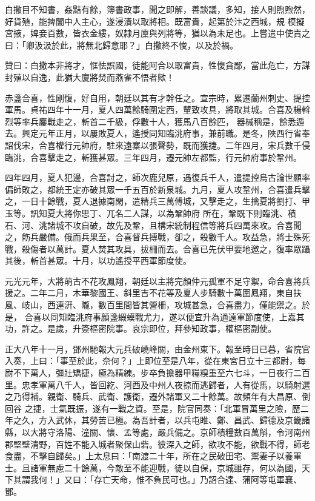 \begin{pinyinscope}
 白撒目不知書，姦黠有餘，簿書政事，聞之即解，善談議，多知，接人則煦煦然，好貨殖，能捭闔中人主心，遂浸漬以取將相。既富貴，起第於汴之西城，規
 模擬宮掖，婢妾百數，皆衣金縷，奴隸月廩與列將等，猶以為未足也。上嘗遣中使責之曰：「卿汲汲於此，將無北歸意耶？」白撒終不悛，以及於禍。



 贊曰：白撒本非將才，恇怯誤國，徒能阿合以取富貴，性愎貪鄙，當此危亡，方謀封殖以自逸，此猶大廈將焚而燕雀不悟者歟！



 赤盞合喜，性剛愎，好自用，朝廷以其有才幹任之。宣宗時，累遷蘭州刺史、提控軍馬。貞祐四年十一月，夏人四萬餘騎圍定西，輦致攻具，將取其城。合喜及楊斡烈等率兵鏖戰走之，斬首二千級，俘數十人，獲馬八百餘匹，
 器械稱是，餘悉遁去。興定元年正月，以屢敗夏人，遙授同知臨洮府事，兼前職。是冬，陜西行省奉詔伐宋，合喜權行元帥府，駐來遠寨以張聲勢，既而獲捷。二年四月，宋兵數千侵臨洮，合喜擊走之，斬獲甚眾。三年四月，遷元帥左都監，行元帥府事於鞏州。



 四年四月，夏人犯邊，合喜討之，師次鹿兒原，遇復兵千人，遣提控烏古論世顯率偏師敗之，都統王定亦破其眾一千五百於新泉城。九月，夏人攻鞏州，合喜遣兵擊之，一日十餘戰，夏人退據南閑，遣精兵三萬傅城，又擊走之，生擒夏將劉打、甲玉等。訊知夏大將你思丁、兀名二人謀，以為鞏帥府
 所在，鞏既下則臨洮、積石、河、洮諸城不攻自破，故先及鞏，且構宋統制程信等將兵四萬來攻。合喜聞之，飭兵嚴備。俄而兵果至，合喜督兵搏戰，卻之，殺數千人。攻益急，將士殊死戰，殺傷者以萬計。夏人焚其攻具，拔柵而去。合喜已先伏甲要地邀之，復率眾躡其後，斬首甚眾。十月，以功遙授平西軍節度使。



 元光元年，大將萌古不花攻鳳翔，朝廷以主將完顏仲元孤軍不足守禦，命合喜將兵援之。二年二月，木華黎國王、斜里吉不花等及夏人步騎數十萬圍鳳翔，東自扶風、岐山，西連汧、隴，數百里間皆其營柵，攻城甚急，合喜盡力，僅能禦之。於是，
 合喜以同知臨洮府事顏盞蝦蟆戰尤力，遂以便宜升為通遠軍節度使，上嘉其功，許之。是歲，升簽樞密院事。哀宗即位，拜參知政事，權樞密副使。



 正大八年十一月，鄧州馳報大元兵破嶢峰關，由金州東下。報至時日已暮，省院官入奏，上曰：「事至於此，奈何？」上即位至是八年，從在東宮日立十三都尉，每尉不下萬人，彊壯矯捷，極為精練。步卒負擔器甲糧糗重至六七斗，一日夜行二百里。忠孝軍萬八千人，皆回紇、河西及中州人夜掠而逃歸者，人有從馬，以騎射選之乃得補。親衛、騎兵、武衛、護衛，遷外諸軍又二十餘萬。故頻年有大昌原、倒回谷
 之捷，士氣既振，遂有一戰之資。至是，院官同奏：「北軍冒萬里之險，歷二年之久，方入武休，其勞苦已極。為吾計者，以兵屯睢、鄭、昌武、歸德及京畿諸縣，以大將守洛陽、潼關、懷、孟等處，嚴兵備之。京師積糧數百萬斛，令河南州郡堅壁清野，百姓不能入城者聚保山砦。彼深入之師，欲攻不能，欲戰不得，師老食盡，不擊自歸矣。」上太息曰：「南渡二十年，所在之民破田宅、鬻妻子以養軍士。且諸軍無慮二十餘萬，今敵至不能迎戰，徒以自保，京城雖存，何以為國，天下其謂我何！」又曰：「存亡天命，惟不負民可也。」乃詔合達、蒲阿等屯軍襄、鄧。




\end{pinyinscope}
